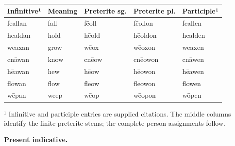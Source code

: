\par\begingroup
\fontsize{10.5}{13.2}\selectfont
\setlength{\LTleft}{0pt}\setlength{\LTright}{\fill}
\noindent
\begin{tabular}{@{}>{\raggedright\arraybackslash}p{23.14mm}>{\raggedright\arraybackslash}p{21.04mm}>{\raggedright\arraybackslash}p{22.72mm}>{\raggedright\arraybackslash}p{22.72mm}>{\raggedright\arraybackslash}p{23.14mm}@{}}
\toprule
\textbf{Infinitive¹} & \textbf{Meaning} & \textbf{Preterite sg.} & \textbf{Preterite pl.} & \textbf{Participle¹} \\
\midrule
feallan & fall & fēoll & fēollon & feallen \\
healdan & hold & hēold & hēoldon & healden \\
weaxan & grow & wēox & wēoxon & weaxen \\
cnāwan & know & cnēow & cnēowon & cnāwen \\
hēawan & hew & hēow & hēowon & hēawen \\
flōwan & flow & flēow & flēowon & flōwen \\
wēpan & weep & wēop & wēopon & wōpen \\
\bottomrule
\end{tabular}
\par\endgroup

¹ Infinitive and participle entries are supplied citations. The middle columns identify the finite preterite stems; the complete person assignments follow.

\textbf{Present indicative.}

